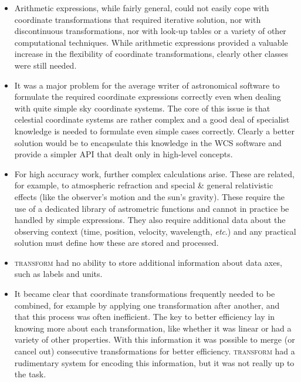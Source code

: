 \documentclass[final,authoryear,5p,times,twocolumn]{elsarticle}
\begin{document}
\begin{itemize}

\item Arithmetic expressions, while fairly general, could not easily
  cope with coordinate transformations that required iterative
  solution, nor with discontinuous transformations, nor with look-up
  tables or a variety of other computational techniques. While
  arithmetic expressions provided a valuable increase in the
  flexibility of coordinate transformations, clearly other classes
  were still needed.

\item It was a major problem for the average writer of astronomical
  software to formulate the required coordinate expressions correctly
  even when dealing with quite simple sky coordinate systems. The core
  of this issue is that celestial coordinate systems are rather
  complex and a good deal of specialist knowledge is needed to
  formulate even simple cases correctly. Clearly a better solution
  would be to encapsulate this knowledge in the WCS software and
  provide a simpler API that dealt only in high-level concepts.

\item For high accuracy work, further complex calculations
  arise. These are related, for example, to atmospheric refraction and
  special \& general relativistic effects (like the observer's motion
  and the sun's gravity).  These require the use of a dedicated
  library of astrometric functions and cannot in practice be handled
  by simple expressions. They also require additional data about the
  observing context (time, position, velocity, wavelength, \emph{etc}.) and
  any practical solution must define how these are stored and
  processed.

\item \textsc{transform} had no ability to store additional
  information about data axes, such as labels and units.

\item It became clear that coordinate transformations frequently
  needed to be combined, for example by applying one transformation
  after another, and that this process was often inefficient. The key
  to better efficiency lay in knowing more about each transformation,
  like whether it was linear or had a variety of other
  properties. With this information it was possible to merge (or
  cancel out) consecutive transformations for better
  efficiency. \textsc{transform} had a rudimentary system for encoding
  this information, but it was not really up to the task.


\end{itemize}
\end{document}
